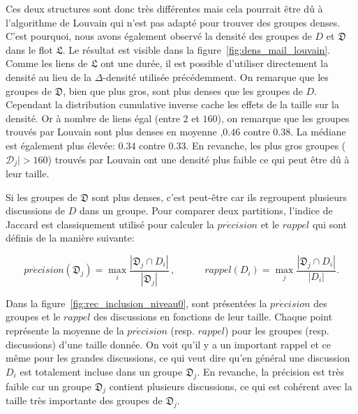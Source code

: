 Ces deux structures sont donc très différentes mais cela pourrait être dû à l'algorithme de Louvain qui n'est pas adapté pour trouver des groupes denses.
C'est pourquoi, nous avons également observé la densité des groupes de $D$ et $\mathfrak{D}$ dans le flot $\mathfrak{L}$.
Le résultat est visible dans la figure~\ref{fig:dens_mail_louvain}.
Comme les liens de $\mathfrak{L}$ ont une durée, il est possible d'utiliser directement la densité au lieu de la $\Delta$-densité utilisée précédemment.
On remarque que les groupes de $\mathfrak{D}$, bien que plus gros, sont plus denses que les groupes de $D$.
Cependant la distribution cumulative inverse cache les effets de la taille sur la densité.
Or à nombre de liens égal (entre $2$ et $160$), on remarque que les groupes trouvés par Louvain sont  plus denses en moyenne ,$0.46$ contre $0.38$. 
La médiane est également plus élevée: $0.34$ contre $0.33$.
En revanche, les plus gros groupes ($\mathcal{D}_j|>160$) trouvés par Louvain ont une densité plus faible ce qui peut être dû à leur taille.

Si les groupes de $\mathfrak{D}$ sont plus denses, c'est peut-être car ils regroupent plusieurs discussions de $D$ dans un groupe.
Pour comparer deux partitions, l'indice de Jaccard est classiquement utilisé pour calculer la $pr\acute{e}cision$ et le $rappel$ qui sont définis de la manière suivante:

\begin{equation*}
pr\acute{e}cision(\mathfrak{D}_j)= \max_{i} \frac{|\mathfrak{D}_j \cap D_i|}{|\mathfrak{D}_j|}\,, \quad \qquad
rappel(D_i)= \max_{j} \frac{|\mathfrak{D}_j \cap D_i|}{|D_i|}.
\label{eq:rappel}
\end{equation*}

Dans la figure~\ref{fig:rec_inclusion_niveau0}, sont présentées la $pr\acute{e}cision$  des groupes et le $rappel$ des discussions en fonctions de leur taille.
Chaque point représente la moyenne de la $pr\acute{e}cision$ (resp. $rappel$) pour les groupes (resp. discussions) d'une taille donnée.
On voit qu'il y a un important rappel et ce même pour les grandes discussions, ce qui veut dire qu'en général une discussion $D_i$ est totalement incluse dans un groupe $\mathfrak{D}_j$.
En revanche, la précision est très faible car un groupe $\mathfrak{D}_j$ contient plusieurs discussions, ce qui est cohérent avec la taille très importante des groupes de $\mathfrak{D}_j$.

